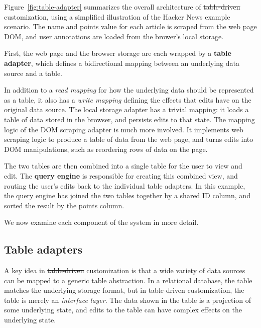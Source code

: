 \documentclass[sigplan,screen,10pt,anonymous,review]{acmart}
\providecommand{\DIFadd}[1]{{\protect\color{blue}\uwave{#1}}} %
\providecommand{\DIFdel}[1]{{\protect\color{red}\sout{#1}}}                      %
\providecommand{\DIFaddbegin}{} %
\providecommand{\DIFaddend}{} %
\providecommand{\DIFdelbegin}{} %
\providecommand{\DIFdelend}{} %
\begin{document}
Figure~\ref{fig:table-adapter} summarizes the overall architecture of
\DIFdelbegin \DIFdel{table-driven }\DIFdelend \DIFaddbegin \DIFadd{data-driven }\DIFaddend customization, using a simplified illustration of the Hacker
News example scenario. The name and points value for each article is
scraped from the web page DOM, and user annotations are loaded from the
brower's local storage.

First, the web page and the browser storage are each wrapped by a
\textbf{table adapter}, which defines a bidirectional mapping between an
underlying data source and a table.

In addition to a \emph{read mapping} for how the underlying data should
be represented as a table, it also has a \emph{write mapping} defining
the effects that edits have on the original data source. The local
storage adapter has a trivial mapping: it loads a table of data stored
in the browser, and persists edits to that state. The mapping logic of
the DOM scraping adapter is much more involved. It implements web
scraping logic to produce a table of data from the web page, and turns
edits into DOM manipulations, such as reordering rows of data on the
page.

The two tables are then combined into a single table for the user to
view and edit. The \textbf{query engine} is responsible for creating
this combined view, and routing the user's edits back to the individual
table adapters. In this example, the query engine has joined the two
tables together by a shared ID column, and sorted the result by the
points column.

We now examine each component of the system in more detail.

\hypertarget{table-adapters}{%
\subsection{Table adapters}\label{table-adapters}}

A key idea in \DIFdelbegin \DIFdel{table-driven }\DIFdelend \DIFaddbegin \DIFadd{data-driven }\DIFaddend customization is that a wide variety of data
sources can be mapped to a generic table abstraction. In a relational
database, the table matches the underlying storage format, but in
\DIFdelbegin \DIFdel{table-driven }\DIFdelend \DIFaddbegin \DIFadd{data-driven }\DIFaddend customization, the table is merely an \emph{interface
layer}. The data shown in the table is a projection of some underlying
state, and edits to the table can have complex effects on the underlying
state.
\end{document}
